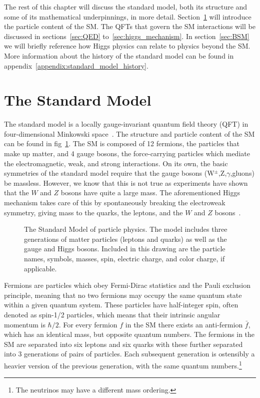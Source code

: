 The rest of this chapter will discuss the standard model, both its structure and some of its mathematical underpinnings, in more detail.
Section~\ref{sec:standard_model} will introduce the particle content of the SM.
The QFTs that govern the SM interactions will be discussed in sections~\ref{sec:QED} to~\ref{sec:higgs_mechanism}.
In section~\ref{sec:BSM} we will briefly reference how Higgs physics can relate to physics beyond the SM.
More information about the history of the standard model can be found in appendix~\ref{appendix:standard_model_history}.

\section{The Standard Model}
\label{sec:standard_model}

The standard model is a locally gauge-invariant quantum field theory (QFT) in four-dimensional Minkowski space~\cite{Burgess2007,Barnes2010}.
The structure and particle content of the SM can be found in fig~\ref{fig:standard_model}.
The SM is composed of 12 fermions, the particles that make up matter, and 4 gauge bosons, the force-carrying particles which mediate the electromagnetic, weak, and strong interactions.
On its own, the basic symmetries of the standard model require that the gauge bosons (W$^\pm$,Z,$\gamma$,gluons) be massless.
However, we know that this is not true as experiments have shown that the $W$ and $Z$ bosons have quite a large mass.
The aforementioned Higgs mechanism takes care of this by spontaneously breaking the electroweak symmetry, giving mass to the quarks, the leptons, and the $W$ and $Z$ bosons~\cite{PhysRevLett.19.1264,salam1968,Dawson:1998yi}.

\begin{figure}[!hbt]
	\centering
	\resizebox{0.95\textwidth}{!}{}
	\caption{The Standard Model of particle physics. The model includes three generations of matter particles (leptons and quarks) as well as the gauge and Higgs bosons. Included in this drawing are the particle names, symbols, masses, spin, electric charge, and color charge, if applicable.}
	\label{fig:standard_model}
\end{figure}

Fermions are particles which obey Fermi-Dirac statistics and the Pauli exclusion principle, meaning that no two fermions may occupy the same quantum state within a given quantum system.
These particles have half-integer spin, often denoted as spin-1/2 particles, which means that their intrinsic angular momentum is $\hbar/2$.
For every fermion $f$ in the SM there exists an anti-fermion $\bar{f}$, which has an identical mass, but opposite quantum numbers.
The fermions in the SM are separated into six leptons and six quarks with these further separated into 3 generations of pairs of particles.
Each subsequent generation is ostensibly a heavier version of the previous generation, with the same quantum numbers.\footnote{The neutrinos may have a different mass ordering.}

